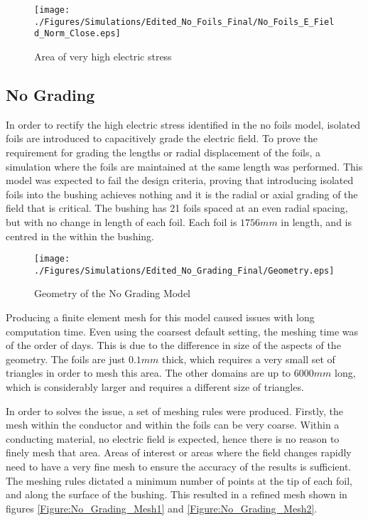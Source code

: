 \begin{figure}[!h]
   \centering
   \texttt{[image: ./Figures/Simulations/Edited\_No\_Foils\_Final/No\_Foils\_E\_Field\_Norm\_Close.eps]}
   \caption{Area of very high electric stress}
   \label{figure:problemfield}
\end{figure}

\subsection{No Grading} \label{ss:no_grading}
In order to rectify the high electric stress identified in the no foils model, isolated foils are introduced to capacitively grade the electric field.
To prove the requirement for grading the lengths or radial displacement of the foils, a simulation where the foils are maintained at the same length was performed.
This model was expected to fail the design criteria, proving that introducing isolated foils into the bushing achieves nothing and it is the radial or axial grading of the field that is critical.
The bushing has 21 foils spaced at an even radial spacing, but with no change in length of each foil.
Each foil is $1756mm$ in length, and is centred in the within the bushing. 

\begin{figure}[!h]
  \centering
    \texttt{[image: ./Figures/Simulations/Edited\_No\_Grading\_Final/Geometry.eps]} 
	\caption{Geometry of the No Grading Model}
	\label{Figure:No_Grading_Geom}
\end{figure}

Producing a finite element mesh for this model caused issues with long computation time. 
Even using the coarsest default setting, the meshing time was of the order of days.
This is due to the difference in size of the aspects of the geometry.
The foils are just $0.1mm$ thick, which requires a very small set of triangles in order to mesh this area.
The other domains are up to $6000mm$ long, which is considerably larger and requires a different size of triangles.

In order to solves the issue, a set of meshing rules were produced.
Firstly, the mesh within the conductor and within the foils can be very coarse.
Within a conducting material, no electric field is expected, hence there is no reason to finely mesh that area.
Areas of interest or areas where the field changes rapidly need to have a very fine mesh to ensure the accuracy of the results is sufficient.
The meshing rules dictated a minimum number of points at the tip of each foil, and along the surface of the bushing.
This resulted in a refined mesh shown in figures \ref{Figure:No_Grading_Mesh1} and \ref{Figure:No_Grading_Mesh2}.


